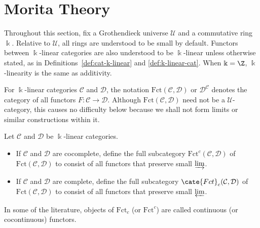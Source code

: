 
\section{Morita Theory}\label{sec:Morita}
\hypertarget{o014.aljabr2.chapter7.morita-theory-a}{ }
Throughout this section, fix a Grothendieck universe $\mathcal{U}$ and a
commutative ring $\Bbbk$. Relative to $\mathcal{U}$, all rings are understood
to be small by default. Functors between $\Bbbk$-linear categories are also
understood to be $\Bbbk$-linear unless otherwise stated, as in
Definitions~\ref{def:cat-k-linear} and \ref{def:k-linear-cat}. When
$\Bbbk=\Z$, $\Bbbk$-linearity is the same as additivity.

For $\Bbbk$-linear categories $\mathcal{C}$ and $\mathcal{D}$, the notation
$\mathrm{Fct}(\mathcal{C},\mathcal{D})$ or
$\mathcal{D}^{\mathcal{C}}$ denotes the category of all functors
$F:\mathcal{C}\to\mathcal{D}$. Although
$\mathrm{Fct}(\mathcal{C},\mathcal{D})$ need not be a
$\mathcal{U}$-category, this causes no difficulty below because we shall not
form limits or similar constructions within it.

\begin{definition}
	Let $\mathcal{C}$ and $\mathcal{D}$ be $\Bbbk$-linear categories.
	\begin{itemize}
		\item If $\mathcal{C}$ and $\mathcal{D}$ are cocomplete, define
		the full subcategory $\mathrm{Fct}^c(\mathcal{C},\mathcal{D})$ of
		$\mathrm{Fct}(\mathcal{C},\mathcal{D})$ to consist of all functors
		that preserve small $\varinjlim$.
		\item If $\mathcal{C}$ and $\mathcal{D}$ are complete, define
		the full subcategory $\cate{Fct}_c(\mathcal{C},\mathcal{D})$ of
		$\mathrm{Fct}(\mathcal{C},\mathcal{D})$ to consist of all functors
		that preserve small $\varprojlim$.
	\end{itemize}
	In some of the literature, objects of $\mathrm{Fct}_c$ (or
	$\mathrm{Fct}^c$) are called continuous (or cocontinuous) functors.
\end{definition}

